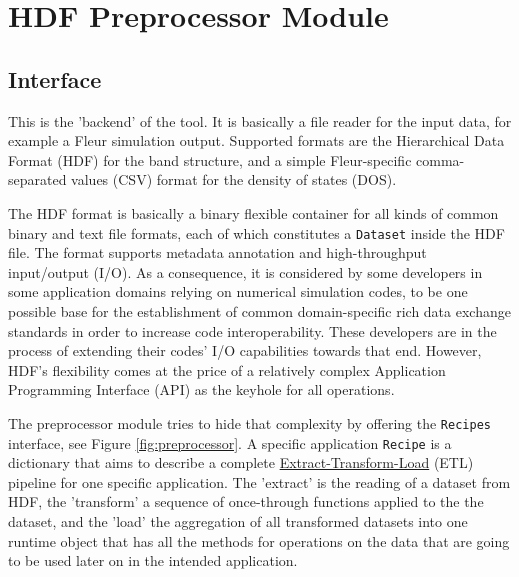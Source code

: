 \section{HDF Preprocessor Module}
\label{sec:preprocessor-module}

\subsection{Interface}
\label{sec:preprocessor-interface}

This is the 'backend' of the tool. It is basically a file reader for the input
data, for example a Fleur simulation output. Supported formats are the
Hierarchical Data Format (HDF) \cite{hdf} for the band structure, and a simple
Fleur-specific comma-separated values (CSV) format for the density of states
(DOS).

The HDF format is basically a binary flexible container for all kinds of common
binary and text file formats, each of which constitutes a \texttt{Dataset}
inside the HDF file. The format supports metadata annotation and high-throughput
input/output (I/O). As a consequence, it is considered by some developers in
some application domains relying on numerical simulation codes, to be one
possible base for the establishment of common domain-specific rich data exchange
standards in order to increase code interoperability. These developers are in
the process of extending their codes' I/O capabilities towards that end.
However, HDF's flexibility comes at the price of a relatively complex Application
Programming Interface (API) as the keyhole for all operations.

The preprocessor module tries to hide that complexity by offering the
\texttt{Recipes} interface, see Figure \ref{fig:preprocessor}. A specific
application \texttt{Recipe} is a dictionary that aims to describe a complete
\href{https://en.wikipedia.org/wiki/Extract,_transform,_load}{Extract-Transform-Load}
(ETL) pipeline for one specific application. The 'extract' is the reading of a
dataset from HDF, the 'transform' a sequence of once-through functions applied
to the the dataset, and the 'load' the aggregation of all transformed datasets
into one runtime object that has all the methods for operations on the data that
are going to be used later on in the intended application.

